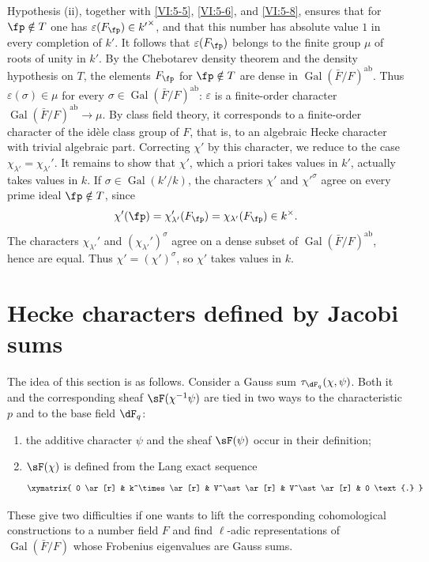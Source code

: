 \documentclass[12pt,oneside,english]{smfbook}
\DeclareMathOperator{\gal}{Gal}
\newcounter{char}
\begin{document}
Hypothesis (ii), together with \ref{VI:5-5}, \ref{VI:5-6}, and \ref{VI:5-8}, ensures that for $\fp\notin T$ one has $\varepsilon(F_\fp)\in{k'}^\times$, and that this number has absolute value $1$ in every completion of $k'$. It follows that $\varepsilon(F_\fp)$ belongs to the finite group $\mu$ of roots of unity in $k'$. By the Chebotarev density theorem and the density hypothesis on $T$, the elements $F_\fp$ for $\fp\notin T$ are dense in $\gal(\bar F/F)^\mathrm{ab}$. Thus $\varepsilon(\sigma)\in\mu$ for every $\sigma\in\gal(\bar F/F)^\mathrm{ab}$: $\varepsilon$ is a finite-order character $\gal(\bar F/F)^\mathrm{ab}\to\mu$. By class field theory, it corresponds to a finite-order character of the idèle class group of $F$, that is, to an algebraic Hecke character with trivial algebraic part. Correcting $\chi'$ by this character, we reduce to the case $\chi_{\lambda'}=\chi_{\lambda'}'$. It remains to show that $\chi'$, which a priori takes values in $k'$, actually takes values in $k$. If $\sigma\in\gal(k'/k)$, the characters $\chi'$ and ${\chi'}^\sigma$ agree on every prime ideal $\fp\notin T$, since
\[
  \chi'(\fp)=\chi'_{\lambda'}(F_\fp)
  =\chi_{\lambda'}(F_\fp)\in k^\times.
\]
The characters $\chi_{\lambda'}'$ and $(\chi_{\lambda'}')^\sigma$ agree on a dense subset of $\gal(\bar F/F)^\mathrm{ab}$, hence are equal. Thus $\chi'=(\chi')^\sigma$, so $\chi'$ takes values in $k$.

\section{Hecke characters defined by Jacobi sums}\label{VI:6}

The idea of this section is as follows. Consider a Gauss sum $\tau_{\dF_q}(\chi,\psi)$. Both it and the corresponding sheaf $\sF(\chi^{-1}\psi)$ are tied in two ways to the characteristic $p$ and to the base field $\dF_q$:
\begin{enumerate}[\indent a)]
  \item the additive character $\psi$ and the sheaf $\sF(\psi)$ occur in their definition;
  \item $\sF(\chi)$ is defined from the Lang exact sequence
    \[\xymatrix{
      0 \ar[r]
        & k^\times \ar[r]
        & V^\ast \ar[r]
        & V^\ast \ar[r]
        & 0 \text{.}
    }\]
\end{enumerate}
These give two difficulties if one wants to lift the corresponding cohomological constructions to a number field $F$ and find $\ell$-adic representations of $\gal(\bar F/F)$ whose Frobenius eigenvalues are Gauss sums.
\end{document}
